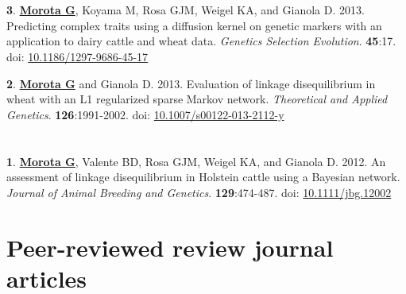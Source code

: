 \documentclass[margin,line,10pt]{res}
\newenvironment{list1}{
  \begin{list}{\ding{113}}{%
      \setlength{\itemsep}{0in}
      \setlength{\parsep}{0in} \setlength{\parskip}{0in}
      \setlength{\topsep}{0in} \setlength{\partopsep}{0in} 
      \setlength{\leftmargin}{0.17in}}}{\end{list}}
\begin{document}
\begin{resume}
\section{}


\begin{list1}
\item [{\bf 3}.]  {\bf \underline{Morota G}}, Koyama M, Rosa GJM, Weigel KA, and Gianola D. 2013.
     Predicting complex traits using a diffusion kernel on genetic markers with an application to dairy cattle and wheat data. \emph{Genetics Selection Evolution}. {\bf 45}:17. doi: \textcolor{blue}{\href{http://dx.doi.org/10.1186/1297-9686-45-17}{10.1186/1297-9686-45-17}}

\vspace{0.5cm}

\item [{\bf 2}.] {\bf \underline{Morota G}} and Gianola D. 2013.  Evaluation of linkage disequilibrium in wheat with an L1 regularized sparse Markov network.
  \emph{Theoretical and Applied Genetics}. {\bf 126}:1991-2002. doi: \textcolor{blue}{\href{http://dx.doi.org/10.1007/s00122-013-2112-y}{10.1007/s00122-013-2112-y}}
\end{list1}


\section{}
\begin{list1} 
\item [{\bf 1}.] {\bf \underline{Morota G}}, Valente BD, Rosa GJM, Weigel KA, and Gianola D. 2012.  
An assessment of linkage disequilibrium in Holstein cattle using a Bayesian network. \emph{Journal of Animal Breeding and Genetics}. {\bf 129}:474-487. doi: \textcolor{blue}{\href{http://dx.doi.org/10.1111/jbg.12002}{10.1111/jbg.12002}}
\end{list1}





\section{\sc Peer-reviewed review journal articles}

\vspace{1.5cm}

\section{}
\begin{list1}




\end{list1}
\end{resume}
\end{document}
